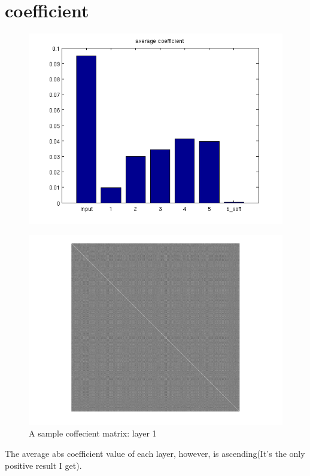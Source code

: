 \documentclass[11pt]{article}
\begin{document}
\section{coefficient}
\begin{figure}[H]
\centering
\includegraphics[scale=0.80]{figs/avg_abs_coefficient.png}
\end{figure}
\begin{figure}[htp]
\centering
\includegraphics[scale=0.50]{figs/0.output.5sw.png}
\caption{A sample coffecient matrix: layer 1}
\end{figure}
The average abs coefficient value of each layer, however, is ascending(It's the only positive result I get).

\end{document}
